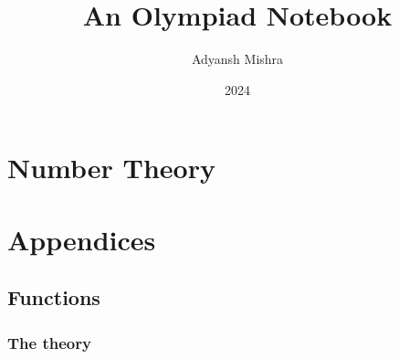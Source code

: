 \documentclass[oneside, a4paper, 10pt]{scrbook}
\begin{document}
	\author{Adyansh Mishra}
	\date{2024}
	\title{An Olympiad Notebook}
	\fncytitle
	
\tableofcontents
	

	
	
	\frontmatter
	
	
	
	\mainmatter	
	\part{Number Theory}
	
	
	
	\appendix
	
	\part{Appendices}
	
	\chapter{Functions}
	\section{The theory}


	
\end{document}
